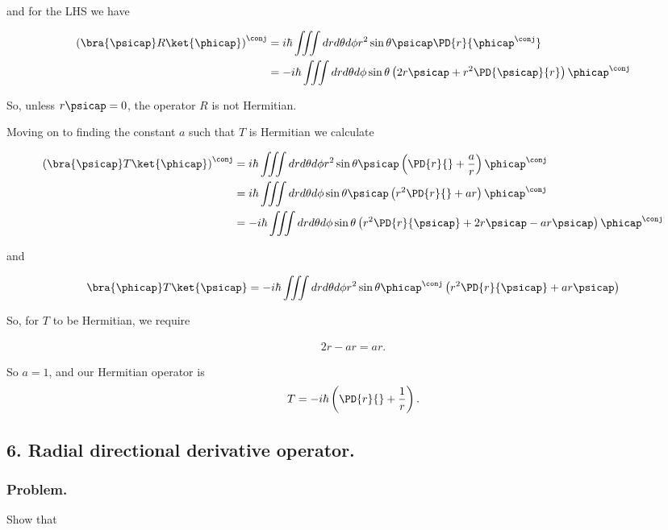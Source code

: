 and for the LHS we have

\begin{align*}
\left( \bra{\psicap} R \ket{\phicap} \right)^\conj
&= i \hbar \iiint dr d\theta d\phi r^2 \sin\theta \psicap \PD{r}{\phicap^\conj} \\
&= -i \hbar \iiint dr d\theta d\phi \sin\theta 
\left( 2 r \psicap 
+ r^2 \PD{\psicap}{r} 
\right)
\phicap^\conj 
\\
\end{align*}

So, unless $r\psicap = 0$, the operator $R$ is not Hermitian.

Moving on to finding the constant $a$ such that $T$ is Hermitian we calculate

\begin{align*}
\left( \bra{\psicap} T \ket{\phicap} \right)^\conj
&= i \hbar \iiint dr d\theta d\phi r^2 \sin\theta \psicap \left( \PD{r}{} + \frac{a}{r} \right) \phicap^\conj \\
&= i \hbar \iiint dr d\theta d\phi \sin\theta \psicap \left( r^2 \PD{r}{} + a r \right) \phicap^\conj \\
&= -i \hbar \iiint dr d\theta d\phi \sin\theta \left( r^2 \PD{r}{\psicap} + 2 r \psicap - a r \psicap \right) \phicap^\conj \\
\end{align*}

and

\begin{align*}
\bra{\phicap} T \ket{\psicap} 
= -i \hbar \iiint dr d\theta d\phi r^2 \sin\theta \phicap^\conj \left( r^2 \PD{r}{\psicap} + a r \psicap \right)
\end{align*}

So, for $T$ to be Hermitian, we require

\begin{align*}
2 r - a r = a r.
\end{align*}

So $a = 1$, and our Hermitian operator is
\begin{align*}
T = -i \hbar \left( \PD{r}{} + \frac{1}{r} \right).
\end{align*}

\subsection{6. Radial directional derivative operator.}

\subsubsection{Problem.}
Show that 


